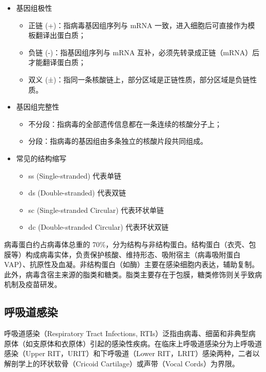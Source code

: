 \documentclass[9pt,a4paper,twoside]{rho-class/rho}
\begin{document}
    \begin{itemize}
        \item 基因组极性
            \begin{itemize}
                \item 正链 (+)：指病毒基因组序列与 mRNA 一致，进入细胞后可直接作为模板翻译出蛋白质；
                \item 负链 (-)：指基因组序列与 mRNA 互补，必须先转录成正链（mRNA）后才能翻译蛋白质；
                \item 双义 (±)：指同一条核酸链上，部分区域是正链性质，部分区域是负链性质。
            \end{itemize}
        \item 基因组完整性
            \begin{itemize}
                \item 不分段：指病毒的全部遗传信息都在一条连续的核酸分子上；
                \item 分段：指病毒的基因组由多条独立的核酸片段共同组成。
            \end{itemize}
        \item 常见的结构缩写
            \begin{itemize}
                \item ss (Single-stranded) 代表单链
                \item ds (Double-stranded) 代表双链
                \item sc (Single-stranded Circular) 代表环状单链
                \item dc (Double-stranded Circular) 代表环状双链
            \end{itemize}
    \end{itemize}

    病毒蛋白约占病毒体总重的 70\%，分为结构与非结构蛋白。结构蛋白（衣壳、包膜等）构成病毒实体，负责保护核酸、维持形态、吸附宿主（病毒吸附蛋白VAP）、抗原性及血凝。非结构蛋白（如酶）主要在感染细胞内表达，辅助复制。此外，病毒含宿主来源的脂类和糖类。脂类主要存在于包膜，糖类修饰则关乎致病机制及疫苗研发。

    \subsection{呼吸道感染}

    呼吸道感染（Respiratory Tract Infections, RTIs）泛指由病毒、细菌和非典型病原体（如支原体和衣原体）引起的感染性疾病。在临床上呼吸道感染分为上呼吸道感染（Upper RIT，URIT）和下呼吸道（Lower RIT，LRIT）感染两种，二者以解剖学上的环状软骨（Cricoid Cartilage）或声带（Vocal Cords）为界限。
    
\end{document}

